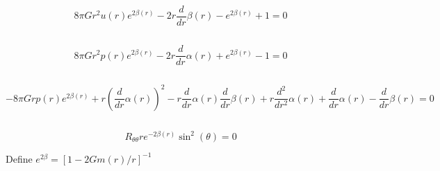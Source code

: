 \documentclass[11pt]{article}
\begin{document}
    \begin{Verbatim}[commandchars=\\\{\}]

    \end{Verbatim}

    $$8 \pi G r^{2} u{\left(r \right)} e^{2 \beta{\left(r \right)}} - 2 r \frac{d}{d r} \beta{\left(r \right)} - e^{2 \beta{\left(r \right)}} + 1=0$$

    
    \begin{Verbatim}[commandchars=\\\{\}]

    \end{Verbatim}

    $$8 \pi G r^{2} p{\left(r \right)} e^{2 \beta{\left(r \right)}} - 2 r \frac{d}{d r} \alpha{\left(r \right)} + e^{2 \beta{\left(r \right)}} - 1=0$$

    
    \begin{Verbatim}[commandchars=\\\{\}]

    \end{Verbatim}

    $$- 8 \pi G r p{\left(r \right)} e^{2 \beta{\left(r \right)}} + r \left(\frac{d}{d r} \alpha{\left(r \right)}\right)^{2} - r \frac{d}{d r} \alpha{\left(r \right)} \frac{d}{d r} \beta{\left(r \right)} + r \frac{d^{2}}{d r^{2}} \alpha{\left(r \right)} + \frac{d}{d r} \alpha{\left(r \right)} - \frac{d}{d r} \beta{\left(r \right)}=0$$

    
    \begin{Verbatim}[commandchars=\\\{\}]

    \end{Verbatim}

    $$R_{\theta \theta} r e^{- 2 \beta{\left(r \right)}} \sin^{2}{\left(\theta \right)}=0$$

    
    Define \(e^{2 \beta} = [1 - 2 G m(r) / r ]^{-1}\)
\end{document}
